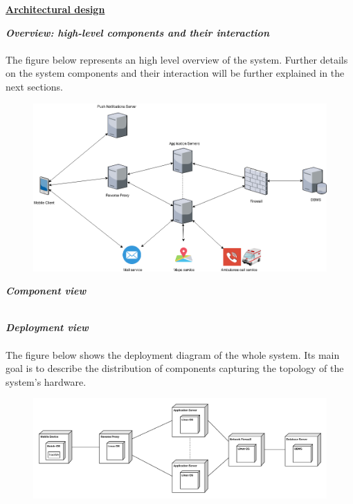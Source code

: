 	\underline{\textbf{Architectural design} }
	\begin{legal}
    		\item \textit{\textbf{Overview: high-level components and their interaction}}\\\\
The figure below represents an high level overview of the system. Further details
on the system components and their interaction will be further explained in the next sections.\\
		\begin{figure}[H]
		\includegraphics[width=\linewidth]{../images/OverviewDiagram.png}
		\end{figure}
		\item \textit{\textbf{Component view}}\\\\
		\item \textit{\textbf{Deployment view}}\\\\
		The figure below shows the deployment diagram of the whole system. Its main goal is to describe the distribution of components capturing the topology of the
system's hardware.\\
		\begin{figure}[H]
		\includegraphics[width=\linewidth]{../images/DeploymentDiagram.png}\\

\end{figure}
\end{legal}
